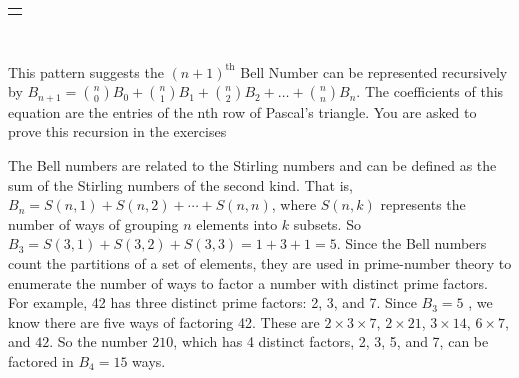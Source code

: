 \documentclass[10pt,]{book}
\theoremstyle{plain}
\theoremstyle{definition}
\theoremstyle{definition}
\numberwithin{equation}{chapter}
\newlength{\panelmax}
\begin{document}
{%
\setlength{\panelmax}{0pt}
\ifdefined\panelboxAtabular\else\newsavebox{\panelboxAtabular}\fi%
\ifdefined\phAtabular\else\newlength{\phAtabular}\fi%
\setlength{\phAtabular}{\ht\panelboxAtabular+\dp\panelboxAtabular}
\settototalheight{\phAtabular}{\usebox{\panelboxAtabular}}
\setlength{\panelmax}{\maxof{\panelmax}{\phAtabular}}
\leavevmode%
\setlength{\tabcolsep}{0\linewidth}
\par\medskip\noindent
\hspace*{0.15\linewidth}%
\begin{tabular}{@{}*{1}{c}@{}}
\begin{minipage}[c][\panelmax][t]{0.7\linewidth}\usebox{\panelboxAtabular}\end{minipage}\end{tabular}\\
}%
\par
\hypertarget{p-160}{}%
This pattern suggests the \({(n + 1)}^{\text{th}}\) Bell Number can be represented recursively by \(B_{n + 1} = \binom{n}{0} B_{0} + \binom{n}{1} B_{1} + \binom{n}{2}B_{2} + \ldots + \binom{n}{n} B_{n}\). The coefficients of this equation are the entries of the nth row of Pascal's triangle. You are asked to prove this recursion in the exercises%
\par
\hypertarget{p-161}{}%
The Bell numbers are related to the Stirling numbers and can be defined as the sum of the Stirling numbers of the second kind. That is, \(B_{n} = S( n,1 ) + S( n,2 ) + \cdots + S(n,n)\), where \(S(n,k)\) represents the number of ways of grouping \(n\) elements into \(k\) subsets. So \(B_{3} = S( 3,1 ) + S( 3,2 ) + S( 3,3 ) = 1 + 3 + 1 = 5\). Since the Bell numbers count the partitions of a set of elements, they are used in prime-number theory to enumerate the number of ways to factor a number with distinct prime factors. For example, 42 has three distinct prime factors: 2, 3, and 7. Since \(B_{3} = 5\) , we know there are five ways of factoring 42. These are \(2 \times 3 \times 7\), \(2 \times 21\), \(3 \times 14\), \(6 \times 7\), and \(42\). So the number \(210\), which has 4 distinct factors, 2, 3, 5, and 7, can be factored in \(B_{4} = 15\) ways.%
\end{document}
